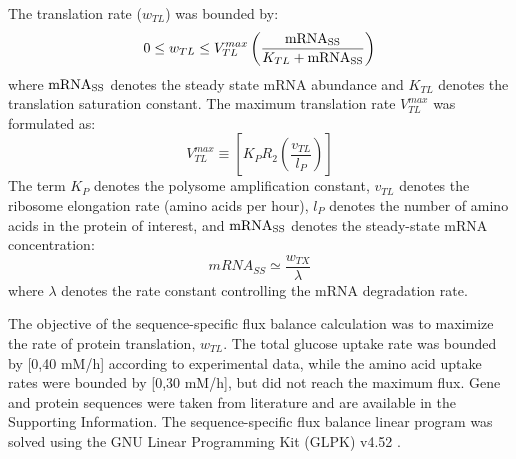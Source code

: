 \documentclass[journal=asbcd6,manuscript=article]{achemso}
\begin{document}
The translation rate ($w_{TL}$) was bounded by:
 \begin{equation}
	0\leq w_{TL} \leq V_{TL}^{max}\left(\frac{\rm mRNA_{SS}}{K_{TL}+\rm mRNA_{SS}}\right)
\end{equation}
where $\rm mRNA_{SS}$ denotes the steady state mRNA abundance and $K_{TL}$ denotes the translation saturation constant.
The maximum translation rate $V_{TL}^{max}$ was formulated as:
\begin{equation}
	V_{TL}^{max} \equiv \left[K_{P} R_{2}\left(\frac{v_{TL}}{l_{P}}\right)\right]
\end{equation}
The term $K_{P}$ denotes the polysome amplification constant,
$v_{TL}$ denotes the ribosome elongation rate (amino acids per hour),
$l_{P}$ denotes the number of amino acids in the protein of interest,
and $\rm mRNA_{SS}$ denotes the steady-state mRNA concentration:
\begin{equation}
	 mRNA_{SS}\simeq\frac{w_{TX}}{\lambda}
\end{equation}
where $\lambda$ denotes the rate constant controlling the mRNA degradation rate.

The objective of the sequence-specific flux balance calculation was to maximize the rate of protein translation, $w_{TL}$.
The total glucose uptake rate was bounded by [0,40 mM/h] according to experimental data, while the amino acid uptake rates were bounded by [0,30 mM/h], but did not reach the maximum flux.
Gene and protein sequences were taken from literature and are available in the Supporting Information.
The sequence-specific flux balance linear program was solved using the GNU Linear Programming Kit (GLPK) v4.52 \cite{GLPK}.
\end{document}
